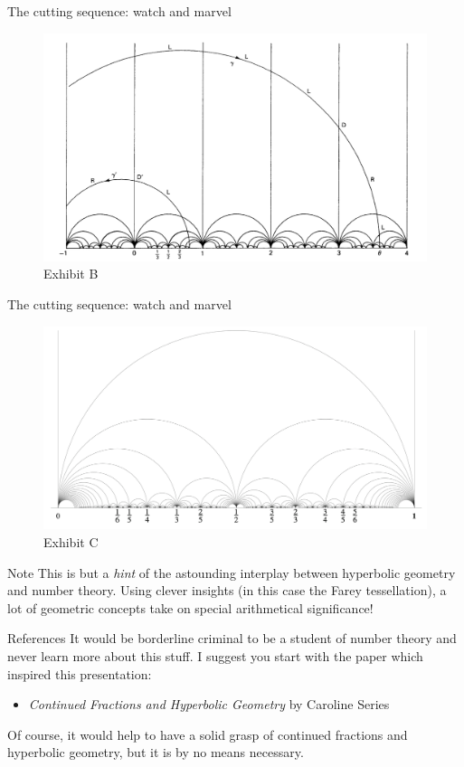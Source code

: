 \documentclass[serif]{beamer}
\begin{document}
\begin{frame}{The cutting sequence: watch and marvel}
    \begin{figure}
        \centering
        \includegraphics[scale=0.32]{pics/ex3.png}
        \caption{Exhibit B}
        \label{fig:my_label}
    \end{figure}
\end{frame}

\begin{frame}{The cutting sequence: watch and marvel}
    \begin{figure}
        \centering
        \includegraphics[scale=0.25]{pics/secondex.png}
        \caption{Exhibit C}
    \end{figure}
\end{frame}

\begin{frame}{Note}
    This is but a \emph{hint} of the astounding interplay between hyperbolic geometry and number theory. Using clever insights (in this case the Farey tessellation), a lot of geometric concepts take on special arithmetical significance! 
\end{frame}

\begin{frame}{References}
    It would be borderline criminal to be a student of number theory and never learn more about this stuff. I suggest you start with the paper which inspired this presentation:
    \begin{itemize}
        \item \emph{Continued Fractions and Hyperbolic Geometry} by Caroline Series
    \end{itemize}
    Of course, it would help to have a solid grasp of continued fractions and hyperbolic geometry, but it is by no means necessary.
\end{frame}
\end{document}
